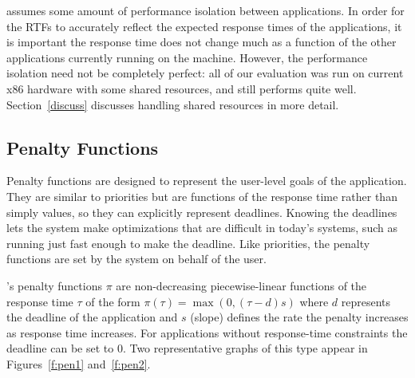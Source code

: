 \pacora assumes some amount of performance isolation between
applications.  In order for the RTFs to accurately reflect the
expected response times of the applications, it is important the
response time does not change much as a function of the other
applications currently running on the machine.  However, the
performance isolation need not be completely perfect: all of our
evaluation was run on current x86 hardware with some shared resources,
and \pacora still performs quite well. Section~\ref{discuss} discusses
handling shared resources in more detail.

\subsection{Penalty Functions}
Penalty functions are designed to represent the user-level goals of
the application. They are similar to priorities but are functions of
the response time rather than simply values, so they can explicitly
represent deadlines.  Knowing the deadlines lets the system make
optimizations that are difficult in today's systems, such as running
just fast enough to make the deadline. Like priorities, the penalty
functions are set by the system on behalf of the user.

\pacora's penalty functions $\pi$ are non-decreasing piecewise-linear
functions of the response time $\tau$ of the form $\pi(\tau) = \max(0, (\tau - d)s)$
where $d$ represents the deadline of the application and $s$ (slope)
defines the rate the penalty increases as response time increases. For
applications without response-time constraints the deadline can be set
to $0$. Two representative graphs of this type appear in
Figures~\ref{f:pen1} and~\ref{f:pen2}.


